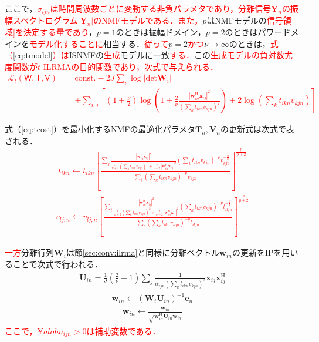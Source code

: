 ここで，\textcolor{red}{$\sigma_{ijn}$は時間周波数ごとに変動する非負パラメタであり，分離信号$\bm{Y}_{n}$の振幅スペクトログラム$|\bm{Y}_{n}|$のNMFモデルである．また，}$p$はNMFモデルの\textcolor{red}{信号領域]を決定する量であり}，$p=1$のときは振幅ドメイン，$p=2$のときはパワードメインを\textcolor{red}{モデル化することに}相当する．\textcolor{red}{従って}$p=2$\textcolor{red}{かつ}$\nu\rightarrow\infty$のときは，\textcolor{red}{式（\ref{eq:tmodel}）は}ISNMFの\textcolor{red}{生成}モデルに一致\textcolor{red}{する．}この\textcolor{red}{生成モデルの負対数尤度関数が$t$-ILRMAの目的関数であり，次式で与えられる．}
\textcolor{red}{
\begin{align}
    \nonumber \mathcal{L}_{t}(\mathsf{W, T, V}) =& \mathrm{const.}-2J \sum_{i}\log|\mathrm{det}\bm{W}_{i}| \\
&+\sum_{i,j}\left\lbrack\left(1+\frac{\nu}{2}\right)\log\left(1+\frac{2}{\nu}\frac{|\bm{w}_{in}^{\mathrm{H}}\bm{x}_{ij}|^2}{\left(\sum_{k}t_{ikn}v_{kjn}\right)^2}\right)+2\log\left(\sum_{k}t_{ikn}v_{kjn}\right)\right\rbrack \label{eq:tcost}
\end{align}}

式（\ref{eq:tcost}）を最小化するNMFの最適化パラメタ$\bm{T}_{n}, \bm{V}_{n}$の更新式は次式で表される．
\textcolor{red}{
\begin{align}
    t_{ikn}\leftarrow t_{ikn}\left\lbrack\frac{\sum_{j}\frac{|\bm{w}_{in}^{\mathrm{H}}\bm{x}_{ij}|^2}{\frac{\nu}{\nu+2}\left(\sum_{k}t_{ikn}v_{kjn}\right)^{2}+\frac{2}{\nu+2}|\bm{w}_{in}^{\mathrm{H}}\bm{x}_{ij}|^2}\left(\sum_{k}t_{ikn}v_{kjn}\right)^{-p}v_{kjn}^{-\frac{2}{p}}}{\sum_{i}\left(\sum_{k}t_{ikn}v_{kjn}\right)^{-p}v_{kjn}}\right\rbrack^{\frac{p}{p+2}} \label{eq:tt}
\end{align}
\begin{align}
    v_{lj,n}\leftarrow v_{lj,n}\left\lbrack\frac{\sum_{i}\frac{|\bm{w}_{in}^{\mathrm{H}}\bm{x}_{ij}|^2}{\frac{\nu}{\nu+2}\left(\sum_{k}t_{ikn}v_{kjn}\right)^{2}+\frac{2}{\nu+2}|\bm{w}_{in}^{\mathrm{H}}\bm{x}_{ij}|^2}\left(\sum_{k}t_{ikn}v_{kjn}\right)^{-p}t_{il,n}^{-\frac{2}{p}}}{\sum_{i}\left(\sum_{k}t_{ikn}v_{kjn}\right)^{-p}t_{il,n}}\right\rbrack^{\frac{p}{p+2}} \label{eq:tv}
\end{align}}

\textcolor{red}{一方}分離行列$\bm{W}_{i}$は節\ref{sec:conv:ilrma}と同様に分離ベクトル$\bm{w}_{in}$の更新をIPを用いることで次式で行われる．
\begin{align}
    \bm{U}_{in}=\frac{1}{J}\left(\frac{2}{\nu}+1\right)\sum_{j}\frac{1}{\alpha_{ijn}\left(\sum_{k}t_{ikn}v_{kjn}\right)^{2}}\bm{x}_{ij}\bm{x}_{ij}^{\mathrm{H}} \label{eq:tip1}
\end{align}
\begin{align}
    \bm{w}_{in}\leftarrow\left(\bm{W}_{i}\bm{U}_{in}\right)^{-1}\bm{e}_{n} \label{eq:tip2}
\end{align}
\begin{align}
    \bm{w}_{in}\leftarrow\frac{\bm{w}_{in}}{\sqrt{\bm{w}_{in}^{\mathrm{H}}\bm{U}_{in}\bm{w}_{in}}} \label{eq:tip3}
\end{align}
\textcolor{red}{ここで，$¥aloha_{ijn}>0$は補助変数である．}

